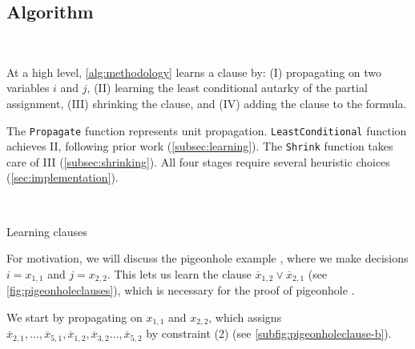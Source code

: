 \subsection{Algorithm}~\label{subsec:methodology}


At a high level, \autoref{alg:methodology} learns a \pr clause by: (I)
propagating on two variables $i$ and $j$, (II) learning the least conditional
autarky of the partial assignment, (III) shrinking the clause, and (IV) adding
the clause to the formula. 

The \texttt{Propagate} function represents unit propagation.
\texttt{LeastConditional} function achieves II, following prior work
(\autoref{subsec:learning}). The \texttt{Shrink} function takes care of III
(\autoref{subsec:shrinking}). All four stages require several heuristic choices (\autoref{sec:implementation}).

\begin{algorithm}~\label{alg:methodology}
    \caption{Learning \pr clauses}\label{alg:methodology}
    \SetAlgoNoLine
\end{algorithm}

For motivation, we will discuss the pigeonhole example , where we make
decisions $i = x_{1, 1}$ and $j = x_{2, 2}$. This lets us learn the clause
$\overline{x}_{1, 2} \lor \overline{x}_{2, 1}$ (see
\autoref{fig:pigeonholeclauses}), which is necessary for the \pr proof of
pigeonhole \cite{prclauses}. 


We start by propagating on $x_{1, 1}$ and $x_{2, 2}$, which assigns
$\overline{x}_{2, 1}, \ldots, \overline{x}_{5, 1}, \overline{x}_{1, 2},
\overline{x}_{3, 2} \ldots, \overline{x}_{5, 2}$ by constraint (2) (see
\autoref{subfig:pigeonholeclause-b}).

